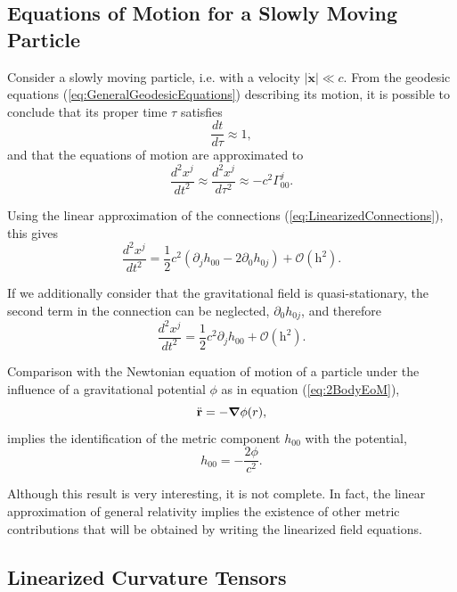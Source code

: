 \subsection{Equations of Motion for a Slowly Moving Particle}

Consider a slowly moving particle, i.e. with a velocity $\left| \dot{\textbf{x}}\right| \ll c$. From the geodesic equations (\ref{eq:GeneralGeodesicEquations}) describing its motion, it is possible to conclude that its proper time $\tau$ satisfies
\begin{equation}
 \frac{dt}{d\tau} \approx 1,
 \end{equation} 
 and that the equations of motion are approximated to 
\begin{equation}
\frac{d^2 x^j}{dt^2} \approx \frac{d^2 x^j}{d\tau^2} \approx - c^2 \Gamma^j_{00} .
\end{equation}

Using the linear approximation of the connections (\ref{eq:LinearizedConnections}), this gives
\begin{equation}
\frac{d^2 x^j}{dt^2} = \frac{1}{2} c^2 \left( \partial_j h_{00} - 2 \partial_0 h_{0j} \right)+ \mathcal{O}(\textrm{h}^2).
\end{equation}

If we additionally consider that the gravitational field is quasi-stationary, the second term in the connection can be neglected, $\partial_0 h_{0j}$, and therefore
\begin{equation}
\frac{d^2 x^j}{dt^2} = \frac{1}{2} c^2\partial_j h_{00}  + \mathcal{O}(\textrm{h}^2).
\end{equation}

Comparison with the Newtonian equation of motion of a particle under the influence of a gravitational potential $\phi$ as in equation (\ref{eq:2BodyEoM}),
\begin{equation}
\ddot{\textbf{r}} = - {\boldsymbol{\nabla}} \phi (r),
\end{equation}
implies the identification of the metric component $h_{00}$ with the potential,
\begin{equation}
h_{00} = -\frac{2\phi}{c^2}.
\end{equation}

Although this result is very interesting, it is not complete. In fact, the linear approximation of general relativity implies the existence of other metric contributions that will be obtained by writing the linearized field equations.

\subsection{Linearized Curvature Tensors}


